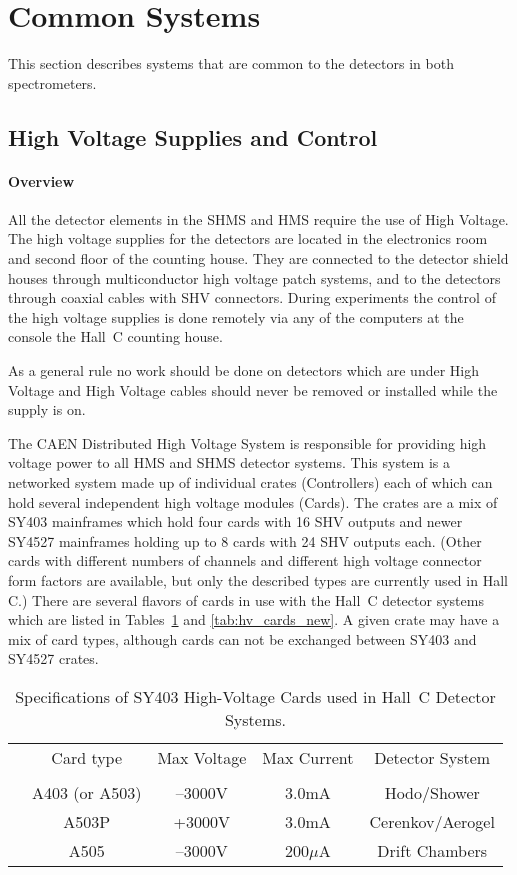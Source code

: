 \section{Common Systems}
This section describes systems that are common to the detectors in both
spectrometers.

\subsection{High Voltage Supplies and Control}
\label{sec:highvoltage}

\paragraph{Overview}

All the detector elements in the SHMS and HMS require the use of High Voltage. The
high voltage supplies for the detectors are located in the
electronics room and second floor of the counting house. They are connected to
the detector shield houses through multiconductor high voltage patch systems,
and to the detectors through coaxial cables with SHV connectors.
During experiments the control of the high voltage supplies is
done remotely via any of the computers at the console 
the Hall~C counting house.

As a general rule no work should be done on detectors which are under
High Voltage and
High Voltage cables should never be removed or installed while the supply is on.

The CAEN Distributed High Voltage System is responsible for
providing high voltage power to all HMS and SHMS detector systems.
This system is a
networked system made up of individual crates (Controllers)
each of which can hold several independent high voltage modules
(Cards).  The crates are a mix of SY403 mainframes which hold four cards
with 16 SHV outputs and newer SY4527 mainframes holding up to 8 cards with 24
SHV outputs each.  (Other cards with different numbers of channels and
different high voltage connector form factors are available, but only
the described types are currently used in Hall C.)
There are several flavors of cards in use with the
Hall~C detector systems which are listed in Tables~\ref{tab:hv_cards}
and \ref{tab:hv_cards_new}.  A given crate may have a mix of card
types, although cards can not be exchanged between SY403 and SY4527 crates.

\begin{table}
\caption{Specifications of SY403 High-Voltage Cards used in Hall~C Detector 
Systems\label{tab:hv_cards}.}
\begin{center}
\begin{tabular}{ccccc}
        &Card type      &Max Voltage    &Max Current    &Detector System \\
	&		&		&		&	\\
	& A403 (or A503)&--3000V	&3.0mA		&Hodo/Shower\\
	& A503P		&+3000V		&3.0mA		&Cerenkov/Aerogel\\
	& A505		&--3000V	&200$\mu$A 	&Drift Chambers\\
  \end{tabular}
\end{center}
\end{table}

